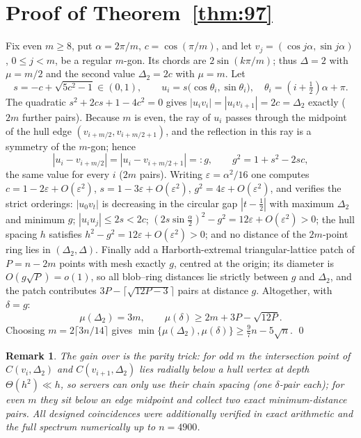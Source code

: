 \documentclass[11pt]{amsart}
\newtheorem{remark}[theorem]{Remark}
\newcommand{\md}{\mu}
\begin{document}
\section{Proof of Theorem~\ref{thm:97}}
Fix even $m\ge8$, put $\alpha=2\pi/m$, $c=\cos(\pi/m)$, and let
$v_j=(\cos j\alpha,\sin j\alpha)$, $0\le j<m$, be a regular $m$-gon. Its chords are
$2\sin(k\pi/m)$; thus $\Delta=2$ with $\md=m/2$ and the second value $\Delta_2=2c$
with $\md=m$. Let
\[ s=-c+\sqrt{5c^2-1}\in(0,1),\qquad u_i=s\big(\cos\theta_i,\sin\theta_i\big),\quad
\theta_i=(i+\tfrac12)\alpha+\pi .\]
The quadratic $s^2+2cs+1-4c^2=0$ gives $|u_iv_i|=|u_iv_{i+1}|=2c=\Delta_2$ exactly
($2m$ further pairs). Because $m$ is even, the ray of $u_i$ passes through the midpoint
of the hull edge $(v_{i+m/2},v_{i+m/2+1})$, and the reflection in this ray is a
symmetry of the $m$-gon; hence
\[ |u_i-v_{i+m/2}|=|u_i-v_{i+m/2+1}|=:g,\qquad g^2=1+s^2-2sc, \]
the same value for every $i$ ($2m$ pairs). Writing $\varepsilon=\alpha^2/16$ one
computes $c=1-2\varepsilon+O(\varepsilon^2)$, $s=1-3\varepsilon+O(\varepsilon^2)$,
$g^2=4\varepsilon+O(\varepsilon^2)$, and verifies the strict orderings: $|u_0v_t|$ is
decreasing in the circular gap $|t-\tfrac12|$ with maximum $\Delta_2$ and minimum $g$;
$|u_iu_j|\le 2s<2c$; $(2s\sin\tfrac\alpha2)^2-g^2=12\varepsilon+O(\varepsilon^2)>0$;
the hull spacing $h$ satisfies $h^2-g^2=12\varepsilon+O(\varepsilon^2)>0$; and no
distance of the $2m$-point ring lies in $(\Delta_2,\Delta)$. Finally add a
Harborth-extremal triangular-lattice patch \cite{Har74} of $P=n-2m$ points with mesh
exactly $g$, centred at the origin; its diameter is $O(g\sqrt P)=o(1)$, so all
blob--ring distances lie strictly between $g$ and $\Delta_2$, and the patch
contributes $3P-\lceil\sqrt{12P-3}\rceil$ pairs at distance $g$. Altogether, with
$\delta=g$:
\[ \md(\Delta_2)=3m,\qquad \md(\delta)\ge 2m+3P-\sqrt{12P}. \]
Choosing $m=2\lceil 3n/14\rceil$ gives
$\min\{\md(\Delta_2),\md(\delta)\}\ge\tfrac97n-5\sqrt n$. \qed

\begin{remark}
The gain over \cite{CDL} is the parity trick: for odd $m$ the intersection point of
$C(v_i,\Delta_2)$ and $C(v_{i+1},\Delta_2)$ lies radially below a hull \emph{vertex}
at depth $\Theta(h^2)\ll h$, so servers can only use their chain spacing (one
$\delta$-pair each); for even $m$ they sit below an edge midpoint and collect two exact
minimum-distance pairs. All designed coincidences were additionally verified in exact
arithmetic and the full spectrum numerically up to $n=4900$.
\end{remark}
\end{document}
